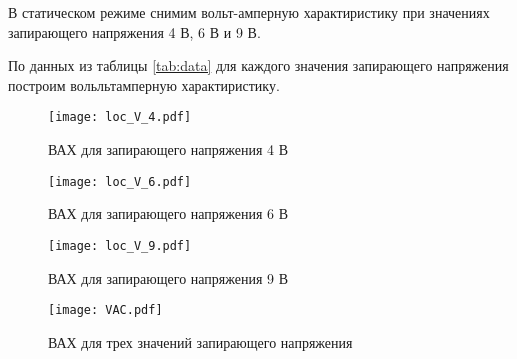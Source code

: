     В статическом режиме снимим вольт-амперную характиристику при значениях запирающего напряжения 4 В, 6 В и 9 В.

    

    По данных из таблицы \ref{tab:data} для каждого значения запирающего напряжения построим вольльтамперную 
    характиристику.

    \begin{figure}[h]
        \centering
        \texttt{[image: loc\_V\_4.pdf]}
        \caption{ВАХ для запирающего напряжения 4 В}
        \label{fig:loc_V_4}
    \end{figure}

    \begin{figure}[h]
        \centering
        \texttt{[image: loc\_V\_6.pdf]}
        \caption{ВАХ для запирающего напряжения 6 В}
        \label{fig:loc_V_6}
    \end{figure}

    \begin{figure}[h]
        \centering
        \texttt{[image: loc\_V\_9.pdf]}
        \caption{ВАХ для запирающего напряжения 9 В}
        \label{fig:loc_V_9}
    \end{figure}

    \begin{figure}[h]
        \centering
        \texttt{[image: VAC.pdf]}
        \caption{ВАХ для трех значений запирающего напряжения}
        \label{fig:VAC}
    \end{figure}


